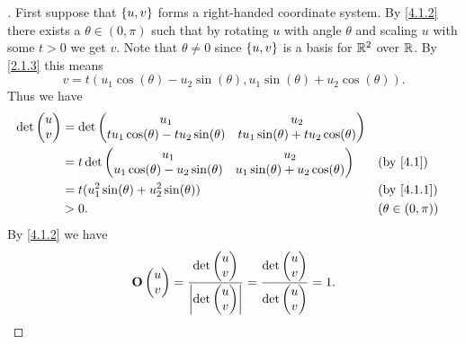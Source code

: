 \begin{proof}[]
  First suppose that \(\left\lbrace u, v\right\rbrace\) forms a right-handed coordinate system.
  By \cref{4.1.2} there exists a \(\theta \in (0, \pi)\) such that by rotating \(u\) with angle \(\theta\) and scaling \(u\) with some \(t > 0\) we get \(v\).
  Note that \(\theta \neq 0\) since \(\left\lbrace u, v\right\rbrace\) is a basis for \(\mathbb{R}^2\) over \(\mathbb{R}\).
  By \cref{2.1.3} this means
  \[
    v = t (u_1 \cos(\theta) - u_2 \sin(\theta), u_1 \sin(\theta) + u_2 \cos(\theta)).
  \]
  Thus we have
  \begin{align*}
    \det\begin{pmatrix}
          u \\
          v
        \end{pmatrix} & = \det\begin{pmatrix}
                                u_1                                     & u_2                                     \\
                                t u_1 \cos(\theta) - t u_2 \sin(\theta) & t u_1 \sin(\theta) + t u_2 \cos(\theta)
                              \end{pmatrix}                              \\
                        & = t \det\begin{pmatrix}
                                    u_1                                 & u_2                                 \\
                                    u_1 \cos(\theta) - u_2 \sin(\theta) & u_1 \sin(\theta) + u_2 \cos(\theta)
                                  \end{pmatrix}         &  & \text{(by \cref{4.1})}                                  \\
                        & = t (u_1^2 \sin(\theta) + u_2^2 \sin(\theta))                                        &  & \text{(by \cref{4.1.1})} \\
                        & > 0.                                                                                 &  & (\theta \in (0, \pi))
  \end{align*}
  By \cref{4.1.2} we have
  \[
    \mathbf{O}\begin{pmatrix}
      u \\
      v
    \end{pmatrix} = \frac{\det\begin{pmatrix}
        u \\
        v
      \end{pmatrix}}{\left\lvert\det\begin{pmatrix}
          u \\
          v
        \end{pmatrix}\right\rvert} = \frac{\det\begin{pmatrix}
        u \\
        v
      \end{pmatrix}}{\det\begin{pmatrix}
        u \\
        v
      \end{pmatrix}} = 1.
  \]


\end{proof}

